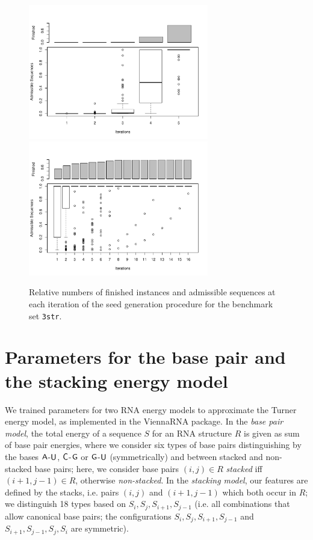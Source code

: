 \documentclass[10pt]{article}
\newcommand{\Def}[1]{\emph{#1}}
\newcommand{\Nuc}[1]{{\sf #1}}
\newcommand{\Ab}{\Nuc{A}}
\newcommand{\Cb}{\Nuc{C}}
\newcommand{\Gb}{\Nuc{G}}
\newcommand{\Ub}{\Nuc{U}}
\newcommand{\Software}[1]{{\ttfamily #1}}
\newenvironment{revision}{\color{red}}{\color{black}}
\begin{document}
\begin{revision}
\begin{figure}[h!]
  \centering
  \includegraphics[width=0.7\textwidth]{Figs/SeedGeneration/iterations_gc_3str.pdf}\\
  \includegraphics[width=0.7\textwidth]{Figs/SeedGeneration/iterations_en_3str.pdf}
  \caption{Relative numbers of finished instances and admissible sequences at each iteration of the seed generation procedure for the benchmark set \texttt{3str}.}
  \label{fig:seed-generation}
\end{figure}
\end{revision}

\section{Parameters for the base pair and the stacking energy model}
\label{appsec:modelparameters}

We trained parameters for two RNA energy models to approximate the
Turner energy model, as implemented in the \Software{ViennaRNA}
package.  In the \Def{base pair model}, the total energy of a sequence $S$
for an RNA structure $R$ is given as sum of base pair energies, where
we consider six types of base pairs distinguishing by the bases $\Ab$-$\Ub$,
$\Cb$-$\Gb$ or $\Gb$-$\Ub$ (symmetrically) and between stacked and non-stacked base
pairs; here, we consider base pairs $(i,j)\in R$ \Def{stacked} iff
$(i+1,j-1)\in R$, otherwise \Def{non-stacked}. In the \Def{stacking model},
our features are defined by the stacks, i.e. pairs $(i,j)$ and
$(i+1,j-1)$ which both occur in $R$; we distinguish 18 types based on
$S_i,S_j,S_{i+1},S_{j-1}$ (i.e. all combinations that allow canonical
base pairs; the configurations $S_i,S_j,S_{i+1},S_{j-1}$ and
$S_{i+1},S_{j-1},S_j,S_i$ are symmetric).
\end{document}
